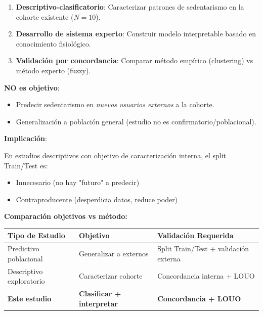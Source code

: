 \documentclass[12pt,letterpaper,twoside]{report}
\begin{document}
\begin{calculobox}
\begin{reglabox}
\begin{enumerate}[noitemsep]
    \item \textbf{Descriptivo-clasificatorio}: Caracterizar patrones de sedentarismo en la cohorte existente ($N=10$).
    \item \textbf{Desarrollo de sistema experto}: Construir modelo interpretable basado en conocimiento fisiológico.
    \item \textbf{Validación por concordancia}: Comparar método empírico (clustering) vs método experto (fuzzy).
\end{enumerate}

\textbf{NO es objetivo}:
\begin{itemize}[noitemsep]
    \item Predecir sedentarismo en \textit{nuevos usuarios externos} a la cohorte.
    \item Generalización a población general (estudio no es confirmatorio/poblacional).
\end{itemize}

\textbf{Implicación}:

En estudios descriptivos con objetivo de caracterización interna, el split Train/Test es:
\begin{itemize}[noitemsep]
    \item Innecesario (no hay "futuro" a predecir)
    \item Contraproducente (desperdicia datos, reduce poder)
\end{itemize}
\end{reglabox}

\begin{calculobox}
\textbf{Comparación objetivos vs método:}

\begin{table}[H]
\centering
\begin{tabular}{@{}lll@{}}
\toprule
\textbf{Tipo de Estudio} & \textbf{Objetivo} & \textbf{Validación Requerida} \\
\midrule
Predictivo poblacional & Generalizar a externos & Split Train/Test + validación externa \\
Descriptivo exploratorio & Caracterizar cohorte & Concordancia interna + LOUO \\
\textbf{Este estudio} & \textbf{Clasificar + interpretar} & \textbf{Concordancia + LOUO} \\
\bottomrule
\end{tabular}
\end{table}
\end{calculobox}


\end{calculobox}
\end{document}
